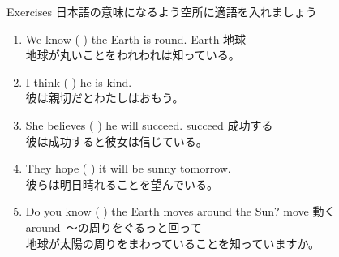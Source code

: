 \documentclass[aspectratio=169,xcolor={dvipsnames,table}]{beamer}
\begin{document}
\begin{frame}[plain]{Exercises}\small
日本語の意味になるよう空所に適語を入れましょう%
\mbox{}\hfill{\scriptsize {}}

 \begin{enumerate}
  \item We know  (  ) the Earth is round.%
	\hfill{\scriptsize Earth  地球}\\
	地球が丸いことをわれわれは知っている。
  \item I think (  ) he is kind.\\
	彼は親切だとわたしはおもう。
  \item She believes (  ) he will succeed.%
	\hfill{\scriptsize succeed  成功する}\\
	彼は成功すると彼女は信じている。
 \item They hope (  ) it will be sunny tomorrow.\\
       彼らは明日晴れることを望んでいる。
 \item Do you know (  ) the Earth moves around the Sun?%
       \hfill{\scriptsize move  動く}\\
       \hfill{\scriptsize around  \,～の周りをぐるっと回って}\\
       地球が太陽の周りをまわっていることを知っていますか。
 \end{enumerate}
\end{frame}
\end{document}
